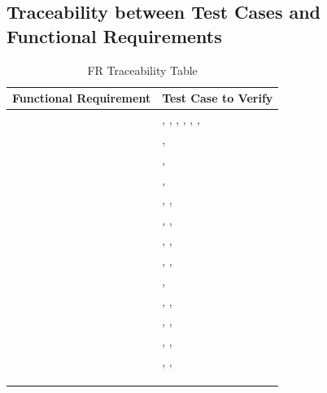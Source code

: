 \documentclass[12pt, titlepage]{article}
\begin{document}
\subsection{Traceability between Test Cases and Functional Requirements}
\begin{table}[!h]
\begin{center}
\caption {FR Traceability Table}
\label{tab:FR_Trace}
\begin{tabular}{ | m{8cm} | m{8cm} | } 
\hline
Functional Requirement & Test Case to Verify \\
\hline
\nameref{GEN_001} & \nameref{tab:STC_001}, \nameref{tab:STC_011}, \nameref{tab:STC_012}, \nameref{tab:STC_013}, \nameref{tab:STC_014}, \nameref{tab:STC_015}, \nameref{tab:STC_016} \\ \hline
\nameref{GEN_002} & \nameref{tab:STC_015}, \nameref{tab:ST16} \\ \hline
\nameref{GEN_003} & \nameref{tab:STC_001}, \nameref{tab:STC_003} \\ \hline
\nameref{GEN_004} & \nameref{tab:STC_001}, \nameref{tab:STC_002} \\ \hline
\nameref{GEN_005} & \nameref{tab:STC_013}, \nameref{tab:STC_016}, \nameref{tab:STC_015} \\ \hline
\nameref{GEN_006} & \nameref{tab:STC_013}, \nameref{tab:STC_016}, \nameref{tab:STC_015} \\ \hline
\nameref{STA_000} & \nameref{tab:STC_001}, \nameref{tab:STC_002}, \nameref{tab:STC_003} \\ \hline
\nameref{STA_001} & \nameref{tab:STC_001}, \nameref{tab:STC_002}, \nameref{tab:STC_003} \\ \hline
\nameref{STA_002} & \nameref{tab:STC_005}, \nameref{tab:STC_011} \\ \hline
\nameref{STA_003} & \nameref{tab:STC_016}, \nameref{tab:STC_012}, \nameref{tab:STC_013} \\ \hline
\nameref{STA_004} & \nameref{tab:STC_001}, \nameref{tab:STC_002}, \nameref{tab:STC_003} \\ \hline
\nameref{STA_005} & \nameref{tab:STC_001}, \nameref{tab:STC_002}, \nameref{tab:STC_003} \\ \hline
\nameref{STA_006} & \nameref{tab:STC_001}, \nameref{tab:STC_002}, \nameref{tab:STC_003} \\ \hline
\nameref{STA_007} & \nameref{tab:STC_011} \\ \hline
\nameref{STA_008} & \nameref{tab:STC_012} \\ \hline
\nameref{STA_009} & \nameref{tab:STC_006} \\ \hline

\end{tabular}
\end{center}
\end{table}
\end{document}
